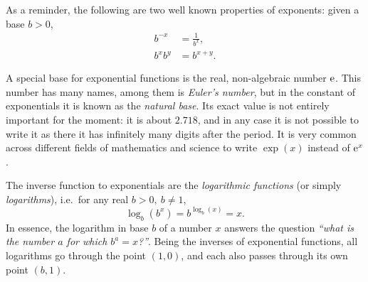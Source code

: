 As a reminder, the following are two well known properties of exponents: given a base $b>0$,
\begin{align}
	b^{-x} &= \frac{1}{b^{x}},\\
	b^{x}b^{y} &= b^{x+y}.
	\label{eq:exponents_properties}
\end{align}

A special base for exponential functions is the real, non-algebraic number $\mathrm{e}$. This number has many names, among them is \emph{Euler's number}, but in the constant of exponentials it is known as the \emph{natural base}. Its exact value is not entirely important for the moment: it is about $2.718$, and in any case it is not possible to write it as there it has infinitely many digits after the period. It is very common across different fields of mathematics and science to write $\exp(x)$ instead of $\mathrm{e}^{x}$.

The inverse function to exponentials are the \emph{logarithmic functions} (or simply \emph{logarithms}), i.e.\ for any real $b>0,\ b\neq1$,
\begin{equation}
	\log_{b}\left( b^{x} \right) = b^{\log_{b}(x)} = x.
	\label{eq:logarithms}
\end{equation}
In essence, the logarithm in base $b$ of a number $x$ answers the question \textit{``what is the number $a$ for which $b^{a}=x$?''}. Being the inverses of exponential functions, all logarithms go through the point $(1,0)$, and each also passes through its own point $(b,1)$.

